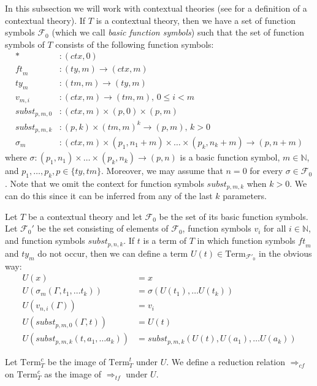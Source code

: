 \documentclass[reqno]{amsart}
\theoremstyle{definition}
\theoremstyle{remark}
\newcommand{\Term}{\mathrm{Term}}
\newcommand{\subst}{\mathit{subst}}
\newcommand{\ft}{\mathit{ft}}
\newcommand{\ty}{\mathit{ty}}
\newcommand{\ctx}{\mathit{ctx}}
\newcommand{\tm}{\mathit{tm}}
\numberwithin{figure}{section}
\begin{document}
In this subsection we will work with contextual theories (see \cite{alg-tt} for a definition of a contextual theory).
If $T$ is a contextual theory, then we have a set of function symbols $\mathcal{F}_0$ (which we call \emph{basic function symbols}) such that the set of function symbols of $T$ consists of the following function symbols:
\begin{align*}
* & : (\ctx,0) \\
\ft_m & : (\ty,m) \to (\ctx,m) \\
\ty_m & : (\tm,m) \to (\ty,m) \\
v_{m,i} & : (\ctx,m) \to (\tm,m) \text{, } 0 \leq i < m \\
\subst_{p,m,0} & : (\ctx,m) \times (p,0) \times (p,m) \\
\subst_{p,m,k} & : (p,k) \times (\tm,m)^k \to (p,m) \text{, } k > 0 \\
\sigma_m & : (\ctx,m) \times (p_1,n_1+m) \times \ldots \times (p_k,n_k+m) \to (p,n+m)
\end{align*}
where $\sigma : (p_1,n_1) \times \ldots \times (p_k,n_k) \to (p,n)$ is a basic function symbol, $m \in \mathbb{N}$, and $p_1, \ldots, p_k, p \in \{ \ty, \tm \}$.
Moreover, we may assume that $n = 0$ for every $\sigma \in \mathcal{F}_0$.
Note that we omit the context for function symbols $\subst_{p,m,k}$ when $k > 0$.
We can do this since it can be inferred from any of the last $k$ parameters.

Let $T$ be a contextual theory and let $\mathcal{F}_0$ be the set of its basic function symbols.
Let $\mathcal{F}_0'$ be the set consisting of elements of $\mathcal{F}_0$, function symbols $v_i$ for all $i \in \mathbb{N}$, and function symbols $\subst_{p,n,k}$.
If $t$ is a term of $T$ in which function symbols $\ft_m$ and $\ty_m$ do not occur, then we can define a term $U(t) \in \Term_{\mathcal{F}'_0}$ in the obvious way:
\begin{align*}
U(x) & = x \\
U(\sigma_m(\Gamma, t_1, \ldots t_k)) & = \sigma(U(t_1), \ldots U(t_k)) \\
U(v_{n,i}(\Gamma)) & = v_i \\
U(\subst_{p,m,0}(\Gamma,t)) & = U(t) \\
U(\subst_{p,m,k}(t, a_1, \ldots a_k)) & = \subst_{p,m,k}(U(t), U(a_1), \ldots U(a_k))
\end{align*}

Let $\Term_T^c$ be the image of $\Term_T^t$ under $U$.
We define a reduction relation $\Rightarrow_{cf}$ on $\Term_T^c$ as the image of $\Rightarrow_{tf}$ under $U$.
\end{document}
